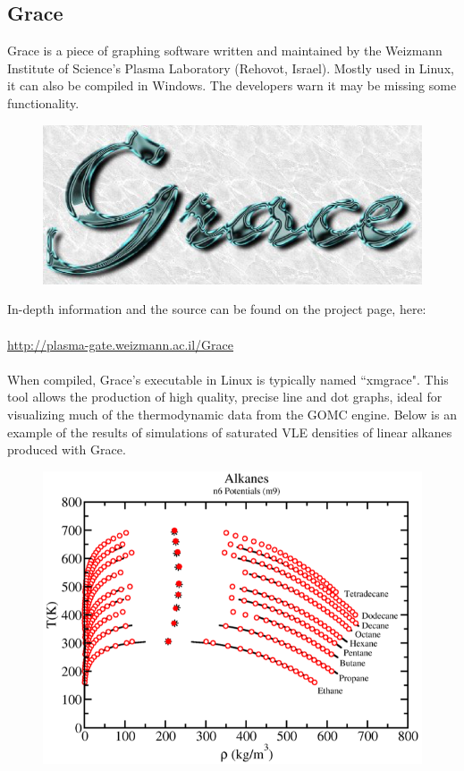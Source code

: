 \subsection{Grace}
Grace is a piece of graphing software written and maintained by the Weizmann Institute of Science's Plasma Laboratory (Rehovot, Israel). Mostly used in Linux, it can also be compiled in Windows.  The developers warn it may be missing some functionality.\\
\begin{figure}[H]
\centering
\includegraphics[scale=0.6]{images/grace}
\end{figure}
In-depth information and the source can be found on the project page, here:\\\\
\url{http://plasma-gate.weizmann.ac.il/Grace}\\\\
When compiled, Grace's executable in Linux is typically named ``xmgrace".  This tool allows the production of high quality, precise line and dot graphs, ideal for visualizing much of the thermodynamic data from the GOMC engine.  Below is an example of the results of simulations of saturated VLE densities of linear alkanes produced with Grace.
\begin{figure}[H]
\centering
\includegraphics[scale=0.6]{images/alkanes}
\end{figure}

